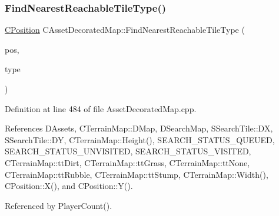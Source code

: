 \subsubsection{\texorpdfstring{Find\+Nearest\+Reachable\+Tile\+Type()}{FindNearestReachableTileType()}}
{\footnotesize\ttfamily \hyperlink{classCPosition}{C\+Position} C\+Asset\+Decorated\+Map\+::\+Find\+Nearest\+Reachable\+Tile\+Type (\begin{DoxyParamCaption}\item[{const \hyperlink{classCPosition}{C\+Position} \&}]{pos,  }\item[{\hyperlink{classCTerrainMap_aff2ab991e237269941416dd79d8871d4}{E\+Tile\+Type}}]{type }\end{DoxyParamCaption})}



Definition at line 484 of file Asset\+Decorated\+Map.\+cpp.



References D\+Assets, C\+Terrain\+Map\+::\+D\+Map, D\+Search\+Map, S\+Search\+Tile\+::\+DX, S\+Search\+Tile\+::\+DY, C\+Terrain\+Map\+::\+Height(), S\+E\+A\+R\+C\+H\+\_\+\+S\+T\+A\+T\+U\+S\+\_\+\+Q\+U\+E\+U\+ED, S\+E\+A\+R\+C\+H\+\_\+\+S\+T\+A\+T\+U\+S\+\_\+\+U\+N\+V\+I\+S\+I\+T\+ED, S\+E\+A\+R\+C\+H\+\_\+\+S\+T\+A\+T\+U\+S\+\_\+\+V\+I\+S\+I\+T\+ED, C\+Terrain\+Map\+::tt\+Dirt, C\+Terrain\+Map\+::tt\+Grass, C\+Terrain\+Map\+::tt\+None, C\+Terrain\+Map\+::tt\+Rubble, C\+Terrain\+Map\+::tt\+Stump, C\+Terrain\+Map\+::\+Width(), C\+Position\+::\+X(), and C\+Position\+::\+Y().



Referenced by Player\+Count().


